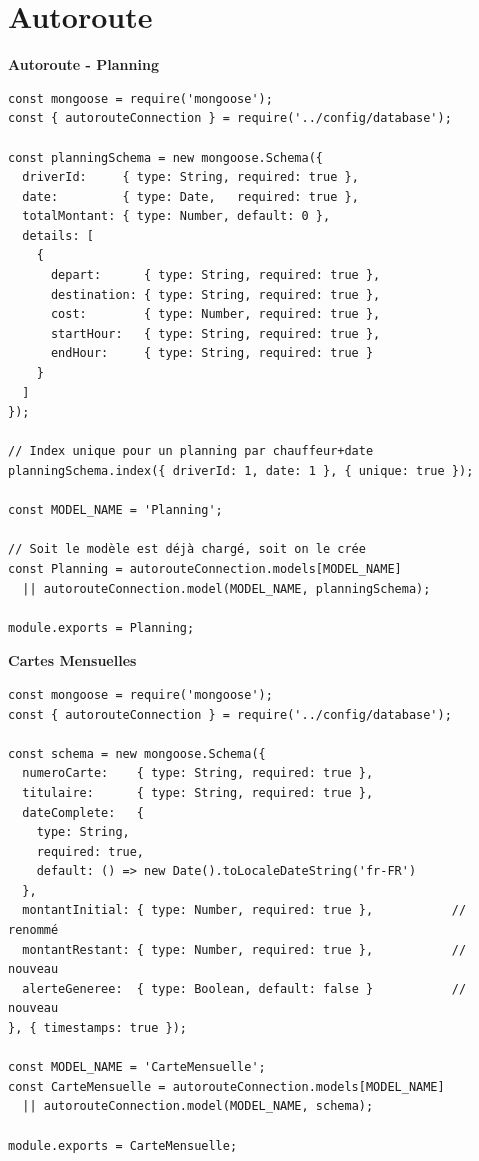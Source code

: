\documentclass[a4paper,11pt]{report}
\begin{document}
\newpage
\section*{Autoroute}

\textbf{Autoroute - Planning}

\begin{lstlisting}[caption=Modèle Planning – server/models/planning.js, label={lst:planning_model}]
const mongoose = require('mongoose');
const { autorouteConnection } = require('../config/database');

const planningSchema = new mongoose.Schema({
  driverId:     { type: String, required: true },
  date:         { type: Date,   required: true },
  totalMontant: { type: Number, default: 0 },
  details: [
    {
      depart:      { type: String, required: true },
      destination: { type: String, required: true },
      cost:        { type: Number, required: true },
      startHour:   { type: String, required: true },
      endHour:     { type: String, required: true }
    }
  ]
});

// Index unique pour un planning par chauffeur+date
planningSchema.index({ driverId: 1, date: 1 }, { unique: true });

const MODEL_NAME = 'Planning';

// Soit le modèle est déjà chargé, soit on le crée
const Planning = autorouteConnection.models[MODEL_NAME]
  || autorouteConnection.model(MODEL_NAME, planningSchema);

module.exports = Planning;
\end{lstlisting}


\textbf{Cartes Mensuelles}

\begin{lstlisting}[caption=Modèle CarteMensuelle – server/models/cartesMensuelles.js, label={lst:cartes_mensuelles_model}]
const mongoose = require('mongoose');
const { autorouteConnection } = require('../config/database');

const schema = new mongoose.Schema({
  numeroCarte:    { type: String, required: true },
  titulaire:      { type: String, required: true },
  dateComplete:   {
    type: String,
    required: true,
    default: () => new Date().toLocaleDateString('fr-FR')
  },
  montantInitial: { type: Number, required: true },           // renommé
  montantRestant: { type: Number, required: true },           // nouveau
  alerteGeneree:  { type: Boolean, default: false }           // nouveau
}, { timestamps: true });

const MODEL_NAME = 'CarteMensuelle';
const CarteMensuelle = autorouteConnection.models[MODEL_NAME]
  || autorouteConnection.model(MODEL_NAME, schema);

module.exports = CarteMensuelle;
\end{lstlisting}
\end{document}
